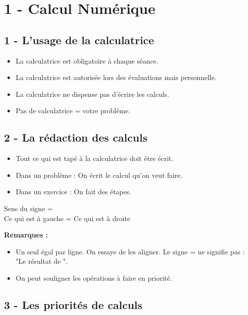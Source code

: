 



\section*{1 - Calcul Numérique}

\subsection*{1 - L'usage de la calculatrice}

\begin{itemize}[label={$\bullet$}]
  \item La calculatrice est obligatoire à chaque séance.
  \item La calculatrice est autorisée lors des évaluations mais personnelle.
  \item La calculatrice ne dispense pas d'écrire les calculs.
  \item Pas de calculatrice = votre problème.
\end{itemize}

\subsection*{2 - La rédaction des calculs}

\begin{itemize}[label={$\bullet$}]
  \item Tout ce qui est tapé à la calculatrice doit être écrit. 
  \item Dans un problème : On écrit le calcul qu'on veut faire.
  \item Dans un exercice : On fait des étapes.
\end{itemize}

\begin{Definition}{Sens du signe =}\\
  Ce qui est à gauche = Ce qui est à droite
\end{Definition}

\textbf{Remarques : }
\begin{itemize}[label={$\bullet$}]
  \item Un seul égal par ligne. On essaye de les aligner. Le signe = ne signifie pas : "Le résultat de ".
  \item On peut souligner les opérations à faire en priorité. 
\end{itemize}

\subsection*{3 - Les priorités de calculs}

